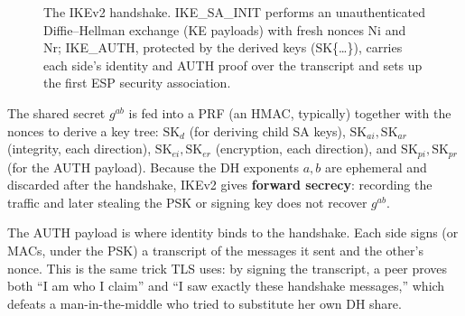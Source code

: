 \begin{figure}[H]
\centering
{}
\caption{The IKEv2 handshake. IKE\_SA\_INIT performs an unauthenticated Diffie--Hellman exchange (KE payloads) with fresh nonces Ni and Nr; IKE\_AUTH, protected by the derived keys (SK\{\ldots\}), carries each side's identity and AUTH proof over the transcript and sets up the first ESP security association.}
\label{fig:ch30:ikev2-handshake}
\end{figure}



The shared secret \(g^{ab}\) is fed into a PRF (an HMAC, typically) together with the nonces to derive a key tree: \(\mathrm{SK}_d\) (for deriving child SA keys), \(\mathrm{SK}_{ai}, \mathrm{SK}_{ar}\) (integrity, each direction), \(\mathrm{SK}_{ei}, \mathrm{SK}_{er}\) (encryption, each direction), and \(\mathrm{SK}_{pi}, \mathrm{SK}_{pr}\) (for the AUTH payload). Because the DH exponents \(a,b\) are ephemeral and discarded after the handshake, IKEv2 gives \textbf{forward secrecy}: recording the traffic and later stealing the PSK or signing key does not recover \(g^{ab}\).

The AUTH payload is where identity binds to the handshake. Each side signs (or MACs, under the PSK) a transcript of the messages it sent and the other's nonce. This is the same trick TLS uses: by signing the transcript, a peer proves both ``I am who I claim'' and ``I saw exactly these handshake messages,'' which defeats a man-in-the-middle who tried to substitute her own DH share.

